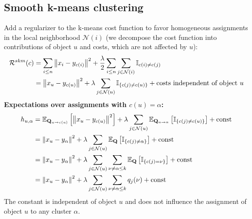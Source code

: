 \documentclass[12pt]{article}
\begin{document}
\subsection{Smooth k-means clustering}
Add a regularizer to the k-means cost function to favor homogeneous
assignments in the local neighborhood $\mathcal{N}(i)$ (we decompose the cost function into contributions of object $u$ and costs, which are not affected by $u$):
\begin{equation*}
\begin{split}
\mathcal{R}^{skm}(c) &= \sum_{i\leq n}\left\lVert x_i - y_{c(i)}\right\rVert^2 + \frac{\lambda}{2} \sum_{i\leq n} \sum_{j\in\mathcal{N}(i)} \mathbb{I}_{c(i)\neq c(j)} \\
&= \left\lVert x_u - y_{c(u)}\right\rVert^2 + \lambda \sum_{j\in\mathcal{N}(u)} \mathbb{I}_{\{c(j)\neq c(u)\}} + \text{costs independent of object $u$}
\end{split}
\end{equation*}
\textbf{Expectations over assignments with $c(u) = \alpha$:}
\begin{equation*}
\begin{split}
h_{u,\alpha} &= \operatorname{\mathbb{E}}_{\mathbf{Q}_{u\rightarrow c(u)}} \left[ \left\lVert x_u - y_{c(u)}\right\rVert^2 \right] + \lambda \sum_{j\in\mathcal{N}(u)} \operatorname{\mathbb{E}}_{\mathbf{Q}_{u\rightarrow \alpha}} \left[ \mathbb{I}_{\{c(j)\neq  c(u) \}} \right] + \text{const} \\
&= \left\lVert x_u - y_{\alpha}\right\rVert^2 + \lambda \sum_{j\in\mathcal{N}(u)} \operatorname{\mathbb{E}}_{\mathbf{Q}} \left[ \mathbb{I}_{\{c(j)\neq\alpha\}} \right] + \text{const} \\
&= \left\lVert x_u - y_{\alpha}\right\rVert^2 + \lambda \sum_{j\in\mathcal{N}(u)} \sum_{\nu\neq\alpha\leq k} \operatorname{\mathbb{E}}_{\mathbf{Q}} \left[ \mathbb{I}_{\{c(j)=\nu\}} \right] + \text{const} \\
&= \left\lVert x_u - y_{\alpha}\right\rVert^2 + \lambda \sum_{j\in\mathcal{N}(u)} \sum_{\nu\neq\alpha\leq k} q_j(\nu) + \text{const}
\end{split}
\end{equation*}
The constant is independent of object $u$ and does not influence the assignment of object $u$ to any cluster $\alpha$.
\end{document}
